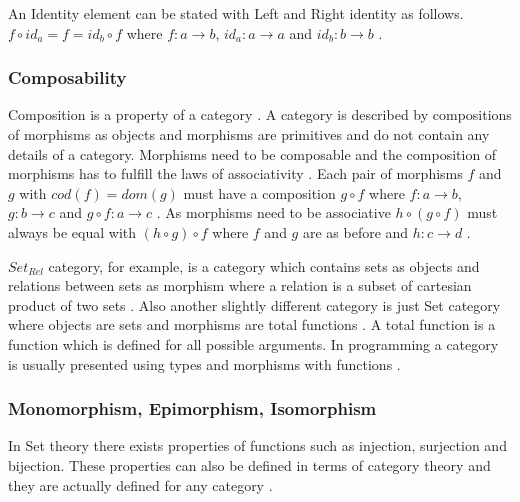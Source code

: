 \documentclass[article]{aaltoseries}
\begin{document}
    An Identity element can be stated with Left and Right identity as follows.
    $f \circ id_a = f = id_b \circ f$ where $f: a \rightarrow b$, $id_a: a
    \rightarrow a$ and $id_b: b \rightarrow b$ \cite{computational, barr1990category}.


  \subsubsection{Composability}
    Composition is a property of a category \cite{barr1990category,
      mac2013categories}. A category is described by compositions of morphisms
    as objects and morphisms are primitives and do not contain any details of a
    category. Morphisms need to be composable and the composition of morphisms
    has to fulfill the laws of associativity \cite{barr1990category,
      computational, mac2013categories}. Each pair of morphisms $f$ and $g$ with
    $cod(f) = dom(g)$ must have a composition $g \circ f$ where $f: a
    \rightarrow b$, $g: b \rightarrow c$ and $g \circ f: a \rightarrow c$
    \cite{mac2013categories}. As morphisms need to be associative $h \circ (g
    \circ f)$ must always be equal with $(h \circ g) \circ f$ where $f$ and $g$
    are as before and $h: c \rightarrow d$ \cite{eilenberg1945general,
      computational, barr1990category, awodey2006category, mac2013categories}.
 
    $Set_{Rel}$ category, for example, is a category which contains sets as
    objects and relations between sets as morphism where a relation is a subset
    of cartesian product of two sets \cite{computational}. Also another slightly
    different category is just Set category where objects are sets and morphisms
    are total functions \cite{barr1990category, computational}. A total function
    is a function which is defined for all possible arguments. In programming a
    category is usually presented using types and morphisms with functions
    \cite{computational}.


  \subsubsection{Monomorphism, Epimorphism, Isomorphism}
    In Set theory there exists properties of functions such as injection,
    surjection and bijection. These properties can also be defined in terms of
    category theory and they are actually defined for any category \cite{barr1990category}.
\end{document}
